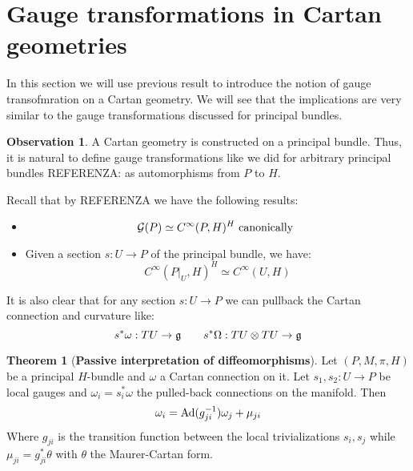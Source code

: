 \documentclass[12pt,a4paper]{report}
\theoremstyle{definition}
\theoremstyle{Theorem}
\newtheorem{Theo}[Def]{Theorem}
\theoremstyle{definition}
\theoremstyle{definition}
\newtheorem{Obs}[Def]{Observation}
\begin{document}
	\section{Gauge transformations in Cartan geometries}
	In this section we will use previous result to introduce the notion of gauge transofmration on a Cartan geometry. We will see that the implications are very similar to the gauge transformations discussed for principal bundles.
	\begin{Obs}
		A Cartan geometry is constructed on a principal bundle. Thus, it is natural to define gauge transformations like we did for arbitrary principal bundles REFERENZA: as automorphisms from $P$ to $H$.
	\end{Obs}
	Recall that by REFERENZA we have the following results:
	\begin{itemize}
		\item $$\mathcal{G}(P)\simeq C^\infty(P,H)^H \hbox{ canonically }$$
		\item Given a section $s:U\rightarrow P$ of the principal bundle, we have:
		$$C^\infty(P|_U,H)^H\simeq C^\infty(U,H)$$
	\end{itemize}
	It is also clear that for any section $s:U\rightarrow P$ we can pullback the Cartan connection and curvature like:
	$$s^*\omega:TU\rightarrow \mathfrak{g}\hspace{20 pt} s^*\Omega:TU\otimes TU\rightarrow \mathfrak{g}$$
		\begin{Theo}[\textbf{Passive interpretation of diffeomorphisms}]
		Let $(P,M,\pi,H)$ be a principal $H$-bundle and $\omega$ a Cartan connection on it. Let $s_1,s_2:U\rightarrow P$ be local gauges and $\omega_{i}=s_i^*\omega$ the pulled-back connections on the manifold. Then 
		$$\omega_i=\hbox{Ad}(g_{ji}^{-1})\omega_j+\mu_{ji}$$
		Where $g_{ji}$ is the transition function between the local trivializations $s_i,s_j$ while $\mu_{ji}=g_{ji}^*\theta$ with $\theta$ the Maurer-Cartan form.
	\end{Theo}
\end{document}
